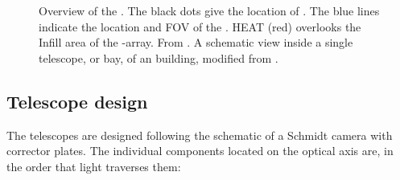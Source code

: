 \begin{figure}[t]
  \centering
  \hspace{0.2cm}
  \caption[]{ Overview of the \PAO. The black dots give the 
  location of \WCDs. The blue lines indicate the location and FOV of the \FD. 
  HEAT (red) overlooks the Infill area of the \SD-array. From \cite{darkoWebsite}. 
   A schematic view inside a single telescope, or bay, 
	of an \FD building, modified from \cite{Abraham2010}.}
  \label{fig:pao-images}
\end{figure}


\subsection{Telescope design}
\label{ssec:fd-design}

The \FD telescopes are designed following the schematic of a Schmidt camera with 
corrector plates. The individual components located on the optical axis are, in 
the order that light traverses them:

